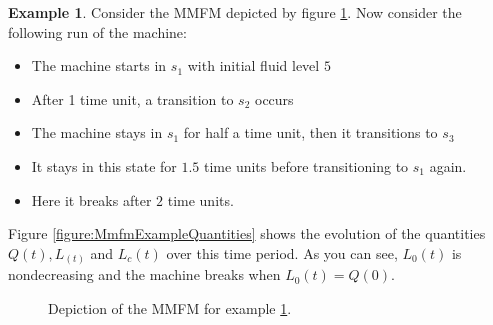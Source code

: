 \documentclass[a4paper]{thesis}
\theoremstyle{definition}
\newtheorem{example}{Example}[chapter]
\begin{document}
\begin{example}\label{example:MmfmState}
	Consider the MMFM depicted by figure \ref{figure:MmfmExample}.
	Now consider the following run of the machine:
	\begin{itemize}
		\item The machine starts in $s_1$ with initial fluid level $5$
		\item After 1 time unit, a transition to $s_2$ occurs
		\item The machine stays in $s_1$ for half a time unit, then it transitions to $s_3$
		\item It stays in this state for $1.5$ time units before transitioning to $s_1$ again.
		\item Here it breaks after $2$ time units.
	\end{itemize}
	Figure \ref{figure:MmfmExampleQuantities} shows the evolution of the quantities $Q(t),L_(t)$ and $L_c(t)$ over this time period.
	As you can see, $L_0(t)$ is nondecreasing and the machine breaks when $L_0(t)=Q(0)$.
\end{example}
\begin{figure}\label{figure:MmfmExample}
\centering
{}
\caption{Depiction of the MMFM for example \ref{example:MmfmState}.}
\end{figure}
\end{document}
